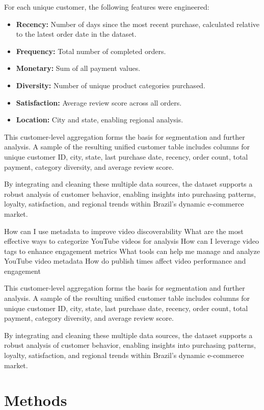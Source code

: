 \documentclass[a4paper]{article}
\begin{document}
\begin{multicols}{2}
For each unique customer, the following features were engineered:
\begin{itemize}
\item \textbf{Recency:} Number of days since the most recent purchase, calculated relative to the latest order date in the dataset.
\item \textbf{Frequency:} Total number of completed orders.
\item \textbf{Monetary:} Sum of all payment values.
\item \textbf{Diversity:} Number of unique product categories purchased.
\item \textbf{Satisfaction:} Average review score across all orders.
\item \textbf{Location:} City and state, enabling regional analysis.
\end{itemize}

This customer-level aggregation forms the basis for segmentation and further analysis. A sample of the resulting unified customer table includes columns for unique customer ID, city, state, last purchase date, recency, order count, total payment, category diversity, and average review score.

By integrating and cleaning these multiple data sources, the dataset supports a robust analysis of customer behavior, enabling insights into purchasing patterns, loyalty, satisfaction, and regional trends within Brazil’s dynamic e-commerce market.

How can I use metadata to improve video discoverability
What are the most effective ways to categorize YouTube videos for analysis
How can I leverage video tags to enhance engagement metrics
What tools can help me manage and analyze YouTube video metadata
How do publish times affect video performance and engagement

This customer-level aggregation forms the basis for segmentation and further analysis. A sample of the resulting unified customer table includes columns for unique customer ID, city, state, last purchase date, recency, order count, total payment, category diversity, and average review score.

By integrating and cleaning these multiple data sources, the dataset supports a robust analysis of customer behavior, enabling insights into purchasing patterns, loyalty, satisfaction, and regional trends within Brazil’s dynamic e-commerce market.



\section{Methods}


\end{multicols}
\end{document}
